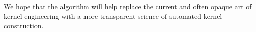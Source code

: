 We hope that the \procedurename{} algorithm will help replace the current and often opaque art of kernel engineering with a more transparent science of automated kernel construction.






